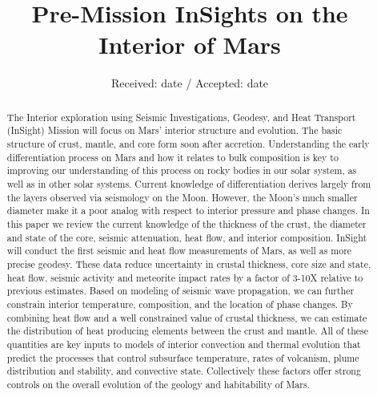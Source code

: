\documentclass[natbib]{svjour3}
\begin{document}
\title{Pre-Mission InSights on the Interior of Mars}

 

\date{Received: date / Accepted: date}

\maketitle

  
\begin{abstract}
The Interior exploration using Seismic Investigations, Geodesy, and Heat Transport (InSight) Mission will focus on Mars' interior structure and evolution.  The basic structure of crust, mantle, and core form soon after accretion.  Understanding the early differentiation process on Mars and how it relates to bulk composition is key to improving our understanding of this process on rocky bodies in our solar system, as well as in other solar systems.  Current knowledge of differentiation derives largely from the layers observed via seismology on the Moon.  However, the Moon's much smaller diameter make it a poor analog with respect to interior pressure and phase changes.  In this paper we review the current knowledge of the thickness of the crust, the diameter and state of the core, seismic attenuation, heat flow, and interior composition. InSight will conduct the first seismic and heat flow measurements of Mars, as well as more precise geodesy.  These data reduce uncertainty in crustal thickness, core size and state, heat flow, seismic activity and meteorite impact rates by a factor of 3-10X relative to previous estimates.  Based on modeling of seismic wave propagation, we can further constrain interior temperature, composition, and the location of phase changes.  By combining heat flow and a well constrained value of crustal thickness, we can estimate the distribution of heat producing elements between the crust and mantle. All of these quantities are key inputs to models of interior convection and thermal evolution that predict the processes that control subsurface temperature, rates of volcanism, plume distribution and stability, and convective state.  Collectively these factors offer strong controls on the overall evolution of the geology and habitability of Mars.
\end{abstract}
\end{document}
